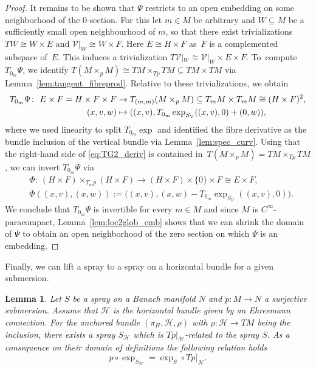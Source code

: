 \documentclass[11pt]{article}
\numberwithin{equation}{section}
\numberwithin{equation}{section}
\newtheorem{Lemma}[Theorem]{Lemma}
\newcommand{\cH}{\ensuremath{\mathcal{H}}}
\newcommand{\cV}{\ensuremath{\mathcal{V}}}
\begin{document}
\begin{proof}
It remains to be shown that $\Psi$ restricts to an open embedding on some neighborhood of the $0$-section. For this let $m \in M$ be arbitrary and $W \subseteq M$ be a sufficiently small open neighbourhood of $m$, so that there exist trivializations $TW \cong W \times E$ and $\cV|_{W} \cong W \times F$. Here $E \cong H\times F$ as~$F$ is a complemented subspace of~$E$. This induces a trivialization $T\cV|_{W} \cong \cV|_{W} \times E \times F$. To~compute $T_{0_m}\Psi$, we identify $T(M\times_p M)\cong TM\times_{Tp} TM\subseteq TM \times TM$ via Lemma~\ref{lem:tangent_fibreprod}. Relative to these trivializations, we obtain
\begin{align}
 T_{0_{m}}\Psi\colon\ E \times F = H\times F \times F &\rightarrow T_{(m,m)}(M \times_{p} M) \subseteq T_{m}M \times T_{m}M \cong (H\times F)^2, \notag \\
 (x,v,w) &\mapsto ((x,v), T_{0_{m}}\exp_{S_{\cV}}((x,v),0) + (0,w)),\label{eq:TG2_deriv}
\end{align}
where we used linearity to split $T_{0_m}\exp$ and identified the fibre derivative as the bundle inclusion of the vertical bundle via Lemma~\ref{lem:spec_curv}. Using that the right-hand side of \eqref{eq:TG2_deriv} is contained in~${T(M\times_p M)=TM \times_{Tp} TM}$, we can invert $T_{0_m}\Psi$ via
\begin{align*}&\Phi\colon\ (H \times F)\times_{T_mp} (H\times F)\rightarrow (H\times F) \times \{0\} \times F \cong E \times F,\\
&\Phi ((x,v),(x,w)):= \bigl((x,v),(x,w)-T_{0_m}\exp_{S_\cV}((x,v),0)\bigr).
\end{align*}
We conclude that $T_{0_m}\Psi$ is invertible for every $m \in M$ and since $M$ is $C^\infty$-paracompact, Lemma~\ref{lem:loc2glob_emb} shows that we can shrink the domain of $\Psi$ to obtain an open neighborhood of the zero section on which $\Psi$ is an embedding.
\end{proof}


Finally, we can lift a spray to a spray on a horizontal bundle for a given submersion.

\begin{Lemma}\label{lem:spray_lifting}
Let $S$ be a spray on a Banach manifold $N$ and $p \colon M \rightarrow N$ a surjective submersion. Assume that $\cH$ is the horizontal bundle given by an Ehresmann connection. For the anchored bundle $(\pi_H,\cH, \rho)$ with $\rho \colon \cH \rightarrow TM$ being the inclusion, there exists a spray $S_\cH$ which is $Tp|_{\cH}$-related to the spray $S$.
As a consequence on their domain of definitions the following relation holds
\begin{displaymath} p\circ \exp_{S_\cH} = \exp_S \circ Tp|_{\cH}.\end{displaymath}
\end{Lemma}
\end{document}
